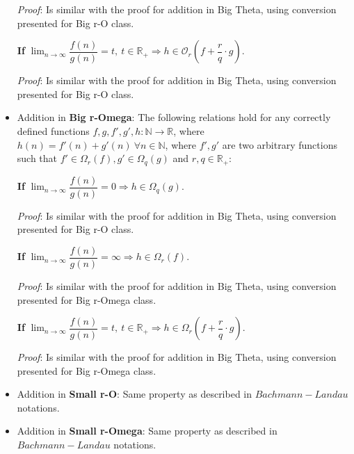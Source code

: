 \begin{itemize}
    \textit{Proof}:
    Is similar with the proof for addition in Big Theta, using conversion presented for Big r-O class.
    \hfill\break
    \begin{theorem}
        \textbf{If} $ \lim_{n\to\infty} \dfrac{f(n)}{g(n)} = t, \ t \in \mathbb{R}_{+} \Rightarrow  h \in \mathcal{O}_{r} \left( f + \dfrac{r}{q} \cdot g \right) $. \\
    \end{theorem}

    \textit{Proof}:
    Is similar with the proof for addition in Big Theta, using conversion presented for Big r-O class.
    \hfill\break


    \item Addition in \textbf{Big r-Omega}:
    The following relations hold for any correctly defined functions $f, g, f', g', h:\mathbb{N}\longrightarrow\mathbb{R}$, where $ h(n) = f'(n) + g'(n)\  \forall n \in \mathbb{N} $, where $f',g'$ are two arbitrary functions such that $ f' \in \Omega_{r}(f), g' \in \Omega_{q}(g) $ and $r,q \in \mathbb{R}_{+}$:
    \begin{theorem}
        \textbf{If} $ \lim_{n\to\infty} \dfrac{f(n)}{g(n)} = 0 \Rightarrow  h \in \Omega_{q}(g) $. \\
    \end{theorem}
    \textit{Proof}:
    Is similar with the proof for addition in Big Theta, using conversion presented for Big r-O class.
    \hfill\break

    \begin{theorem}
        \textbf{If} $ \lim_{n\to\infty} \dfrac{f(n)}{g(n)} = \infty \Rightarrow  h \in \Omega_{r}(f) $. \\
    \end{theorem}
    \textit{Proof}:
    Is similar with the proof for addition in Big Theta, using conversion presented for Big r-Omega class.
    \hfill\break
    \begin{theorem}
        \textbf{If} $ \lim_{n\to\infty} \dfrac{f(n)}{g(n)} = t, \ t \in \mathbb{R}_{+} \Rightarrow  h \in \Omega_{r} \left( f + \dfrac{r}{q} \cdot g \right) $. \\
    \end{theorem}
    \textit{Proof}:
    Is similar with the proof for addition in Big Theta, using conversion presented for Big r-Omega class.
    \hfill\break

    \item Addition in \textbf{Small r-O}:
    Same property as described in $Bachmann-Landau$ notations.
    \item Addition in \textbf{Small r-Omega}:
    Same property as described in $Bachmann-Landau$ notations.
\end{itemize}


